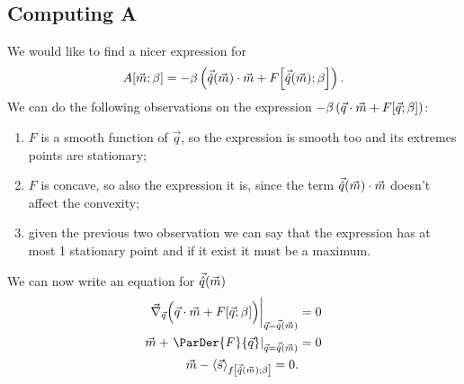 \subsection{Computing A}
We would like to find a nicer expression for
\begin{equation} \label{eq:expression-for-A}
   A{\left[\vec{m};\beta\right]} =
    -\beta \left(\vec{\hat{q}}{(\vec{m})}\cdot\vec{m} + F{\left[\vec{\hat{q}}{(\vec{m})};\beta\right]}\right).
\end{equation}
We can do the following observations on the expression 
\(-\beta \left(\vec{q}\cdot\vec{m} + F{\left[\vec{q};\beta\right]}\right)\):
\begin{enumerate}[i]
  \item \(F\) is a smooth function of \(\vec{q}\), so the expression is smooth too and its
    extremes points are stationary;
  \item \(F\) is concave, so also the expression it is, since the term \(\vec{\hat{q}}{(\vec{m})}\cdot\vec{m}\)
    doesn't affect the convexity;
  \item given the previous two observation we can say that the expression has at most 1 stationary
    point and if it exist it must be a maximum.
\end{enumerate}
We can now write an equation for \(\vec{\hat{q}}{(\vec{m})}\)
\begin{align}
  \nonumber
  \vec{\nabla}_{\vec{q}} \Big(\vec{q}\cdot\vec{m} + \FEn{\vec{q}}{\beta}\Big)
    \bigg|_{\vec{q}=\qhat{\vec{m}}}&=0 \\
  \nonumber
  \vec{m} + \left.\ParDer{F}{\vec{q}}\right|_{\vec{q}=\qhat{\vec{m}}}&=0 \\
  \label{eq:m-s-mean}
  \vec{m} - \Fmean{\vec{s}}{\qhat{\vec{m}}}{\beta} = 0.
\end{align}
